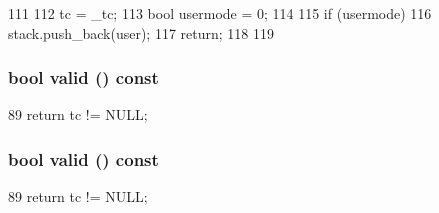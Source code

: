 \begin{DoxyCode}
111 {
112     tc = _tc;
113     bool usermode = 0;
114 
115     if (usermode) {
116         stack.push_back(user);
117         return;
118     }
119 }
\end{DoxyCode}
\hypertarget{classMipsISA_1_1StackTrace_a8d985300b138b6c5556ab17ed4df3b38}{
\subsubsection[{valid}]{\setlength{\rightskip}{0pt plus 5cm}bool valid () const}}
\label{classMipsISA_1_1StackTrace_a8d985300b138b6c5556ab17ed4df3b38}



\begin{DoxyCode}
89 { return tc != NULL; }
\end{DoxyCode}
\hypertarget{classMipsISA_1_1StackTrace_a8d985300b138b6c5556ab17ed4df3b38}{
\subsubsection[{valid}]{\setlength{\rightskip}{0pt plus 5cm}bool valid () const}}
\label{classMipsISA_1_1StackTrace_a8d985300b138b6c5556ab17ed4df3b38}



\begin{DoxyCode}
89 { return tc != NULL; }
\end{DoxyCode}


